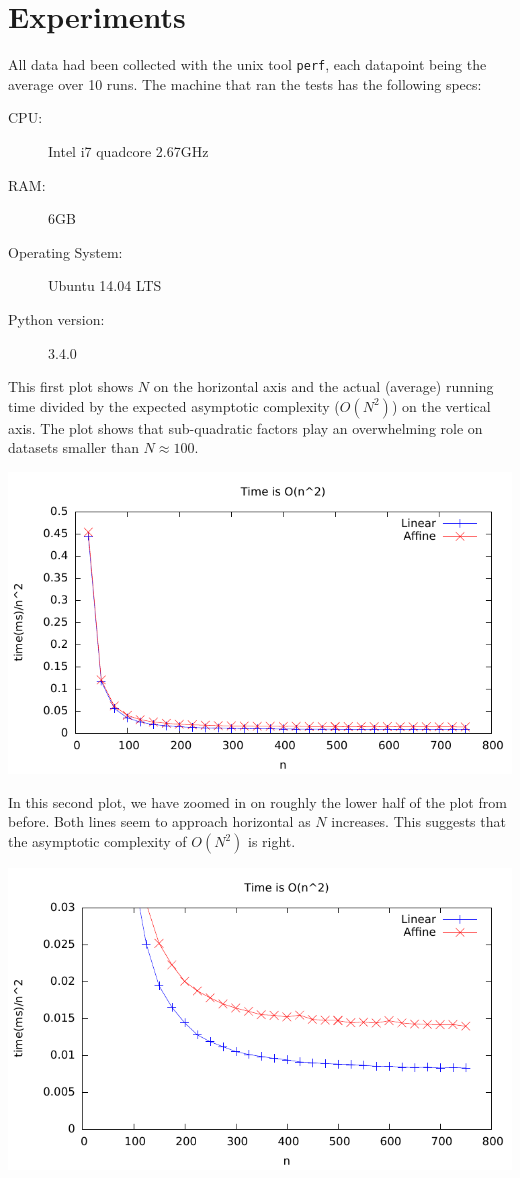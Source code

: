 \section{Experiments}

All data had been collected with the unix tool \verb|perf|, each
datapoint being the average over 10 runs. The machine that ran the
tests has the following specs:
\begin{description}
\item[CPU:] Intel i7 quadcore 2.67GHz
\item[RAM:] 6GB
\item[Operating System:] Ubuntu 14.04 LTS
\item[Python version:] 3.4.0
\end{description}

This first plot shows $N$ on the horizontal axis and the actual
(average) running time divided by the expected asymptotic complexity
($O(N^2)$) on the vertical axis. The plot shows that sub-quadratic
factors play an overwhelming role on datasets smaller than $N \approx
100$.
\begin{center}
	\includegraphics[width=\textwidth]{../plots/plot1.pdf}
\end{center}

In this second plot, we have zoomed in on roughly the lower half of
the plot from before. Both lines seem to approach horizontal as $N$
increases. This suggests that the asymptotic complexity of $O(N^2)$ is
right.
\begin{center}
	\includegraphics[width=\textwidth]{../plots/plot2.pdf}
\end{center}

